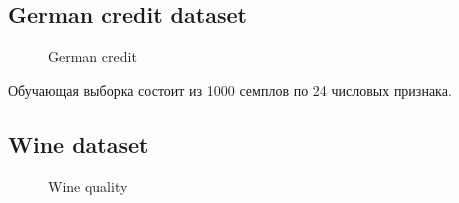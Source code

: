 \documentclass[12pt,twoside]{article}
\begin{document}


\newpage

\subsection{German credit dataset}

\begin{figure}[H]
      \caption{German credit}
\end{figure}




Обучающая выборка состоит из 1000 семплов по 24 числовых признака. 

\newpage

\subsection{Wine dataset}


\begin{figure}[H]
      \caption{Wine quality}
\end{figure}
\end{document}
